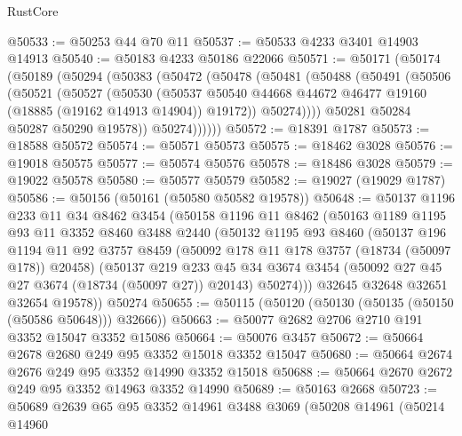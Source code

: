 \begin{lexlean}{RustCore}
\begin{coremodule}
@50533 := @50253 @44 @70 @11
@50537 := @50533 @4233 @3401 @14903 @14913
@50540 := @50183 @4233 @50186 @22066
@50571 := @50171
    (@50174
      (@50189
        (@50294
          (@50383
            (@50472
              (@50478
                (@50481
                  (@50488
                    (@50491
                      (@50506
                        (@50521
                          (@50527
                            (@50530
                              (@50537
                                @50540
                                @44668
                                @44672
                                @46477
                                @19160
                                (@18885 (@19162 @14913 @14904))
                                @19172))
                            @50274))))
                    @50281
                    @50284
                    @50287
                    @50290
                    @19578))
                @50274))))))
@50572 := @18391 @1787
@50573 := @18588 @50572
@50574 := @50571 @50573
@50575 := @18462 @3028
@50576 := @19018 @50575
@50577 := @50574 @50576
@50578 := @18486 @3028
@50579 := @19022 @50578
@50580 := @50577 @50579
@50582 := @19027 (@19029 @1787)
@50586 := @50156 (@50161 (@50580 @50582 @19578))
@50648 := @50137
    @1196
    @233
    @11
    @34
    @8462
    @3454
    (@50158
      @1196
      @11
      @8462
      (@50163
        @1189
        @1195
        @93
        @11
        @3352
        @8460
        @3488
        @2440
        (@50132
          @1195
          @93
          @8460
          (@50137
            @196
            @1194
            @11
            @92
            @3757
            @8459
            (@50092 @178 @11 @178 @3757 (@18734 (@50097 @178)) @20458)
            (@50137
              @219
              @233
              @45
              @34
              @3674
              @3454
              (@50092 @27 @45 @27 @3674 (@18734 (@50097 @27)) @20143)
              @50274)))
        @32645
        @32648
        @32651
        @32654
        @19578))
    @50274
@50655 := @50115 (@50120 (@50130 (@50135 (@50150 (@50586 @50648))) @32666))
@50663 := @50077 @2682 @2706 @2710 @191 @3352 @15047 @3352 @15086
@50664 := @50076 @3457
@50672 := @50664 @2678 @2680 @249 @95 @3352 @15018 @3352 @15047
@50680 := @50664 @2674 @2676 @249 @95 @3352 @14990 @3352 @15018
@50688 := @50664 @2670 @2672 @249 @95 @3352 @14963 @3352 @14990
@50689 := @50163 @2668
@50723 := @50689
    @2639
    @65
    @95
    @3352
    @14961
    @3488
    @3069
    (@50208
      @14961
      (@50214
        @14960

\end{coremodule}
\end{lexlean}
